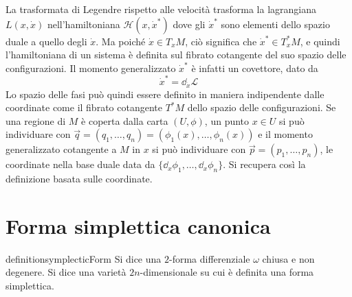 La trasformata di Legendre rispetto alle velocità trasforma la lagrangiana $L(x,\dot{x})$ nell'hamiltoniana $\mathcal{H}(x,\dot{x}^*)$ dove gli $\dot{x}^*$ sono elementi dello spazio duale a quello degli $\dot{x}$. Ma poiché $\dot{x} \in T_x M$, ciò significa che $\dot{x}^* \in T_x^* M$, e quindi l'hamiltoniana di un sistema è definita sul fibrato cotangente del suo spazio delle configurazioni. Il momento generalizzato $\dot{x}^*$ è infatti un covettore, dato da \begin{equation*}
  \dot{x}^* = \dd_{\dot{x}} \mathcal{L}
\end{equation*}
Lo spazio delle fasi può quindi essere definito in maniera indipendente dalle coordinate come il fibrato cotangente $T^* M$ dello spazio delle configurazioni. Se una regione di $M$ è coperta dalla carta $(U,\phi)$, un punto $x \in U$ si può individuare con $\vec{q} = (q_1, \ldots, q_n) = (\phi_1(x), \ldots, \phi_n(x))$ e il momento generalizzato cotangente a $M$ in $x$ si può individuare con $\vec{p}=(p_1, \ldots, p_n)$, le coordinate nella base duale data da $\{\dd_x \phi_1, \ldots, \dd_x \phi_n\} $. Si recupera così la definizione basata sulle coordinate.

\section{Forma simplettica canonica}

\begin{restatable}{definition}{symplecticForm}
  Si dice  una $2$-forma differenziale $\omega$ chiusa e non degenere. Si dice  una varietà $2n$-dimensionale su cui è definita una forma simplettica.
\end{restatable} %